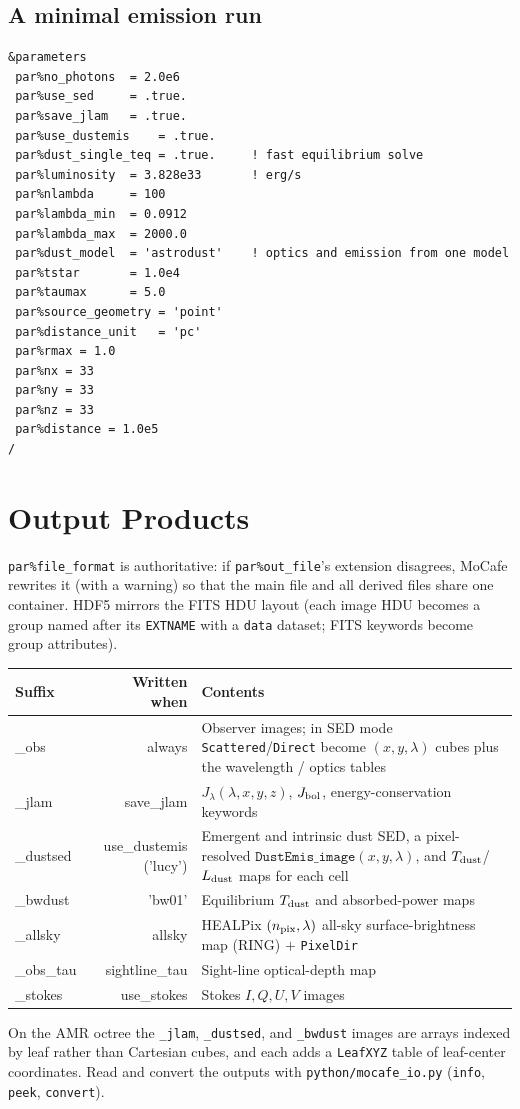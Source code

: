 \documentclass[english,a4paper]{kiseon_memo}
\newcommand{\pp}[1]{\texttt{par\%#1}}
\newcommand{\code}[1]{\texttt{#1}}
\newcommand{\file}[1]{\texttt{#1}}
\begin{document}
\subsection{A minimal emission run}
\begin{lstlisting}[style=nml]
&parameters
 par%no_photons  = 2.0e6
 par%use_sed     = .true.
 par%save_jlam   = .true.
 par%use_dustemis    = .true.
 par%dust_single_teq = .true.     ! fast equilibrium solve
 par%luminosity  = 3.828e33       ! erg/s
 par%nlambda     = 100
 par%lambda_min  = 0.0912
 par%lambda_max  = 2000.0
 par%dust_model  = 'astrodust'    ! optics and emission from one model
 par%tstar       = 1.0e4
 par%taumax      = 5.0
 par%source_geometry = 'point'
 par%distance_unit   = 'pc'
 par%rmax = 1.0
 par%nx = 33
 par%ny = 33
 par%nz = 33
 par%distance = 1.0e5
/
\end{lstlisting}

\section{Output Products}
\pp{file\_format} is authoritative: if \pp{out\_file}'s extension disagrees,
MoCafe rewrites it (with a warning) so that the main file and all derived files
share one container.  HDF5 mirrors the FITS HDU layout (each image HDU becomes
a group named after its \code{EXTNAME} with a \code{data} dataset; FITS
keywords become group attributes).

\begin{longtable}{P D X}
\toprule
\textrm{Suffix} & \textrm{Written when} & \textrm{Contents}\\
\midrule \endhead
\_obs      & always & Observer images; in SED mode \code{Scattered}/\code{Direct} become $(x,y,\lambda)$ cubes plus the wavelength / optics tables\\
\_jlam     & save\_jlam & $J_\lambda(\lambda,x,y,z)$, $J_{\rm bol}$, energy-conservation keywords\\
\_dustsed  & use\_dustemis ('lucy') & Emergent and intrinsic dust SED, a pixel-resolved $\code{DustEmis\_image}(x,y,\lambda)$, and $T_{\rm dust}$/$L_{\rm dust}$ maps for each cell\\
\_bwdust   & 'bw01' & Equilibrium $T_{\rm dust}$ and absorbed-power maps\\
\_allsky   & allsky & HEALPix $(n_{\rm pix},\lambda)$ all-sky surface-brightness map (RING) $+$ \code{PixelDir}\\
\_obs\_tau & sightline\_tau & Sight-line optical-depth map\\
\_stokes   & use\_stokes & Stokes $I,Q,U,V$ images\\
\bottomrule
\end{longtable}
On the AMR octree the \code{\_jlam}, \code{\_dustsed}, and \code{\_bwdust}
images are arrays indexed by leaf rather than Cartesian cubes, and
each adds a \code{LeafXYZ} table of leaf-center coordinates.  Read and convert
the outputs with \file{python/mocafe\_io.py} (\code{info}, \code{peek},
\code{convert}).
\end{document}
